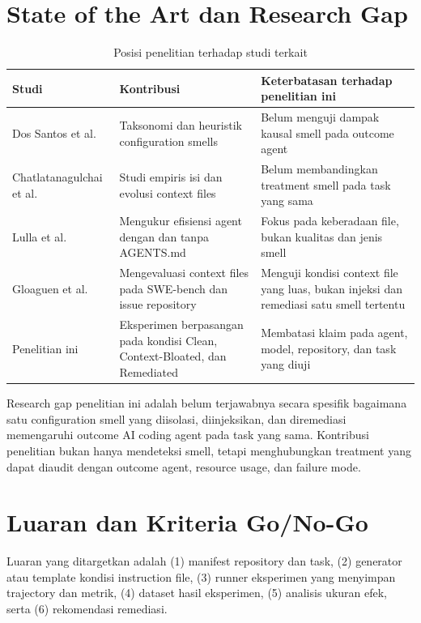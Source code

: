 \section{State of the Art dan Research Gap}

\begin{table}[htbp]
\centering
\small
\caption{Posisi penelitian terhadap studi terkait}
\label{tab:gap}
\begin{tabularx}{\textwidth}{p{3.8cm}YY}
\toprule
\textbf{Studi} & \textbf{Kontribusi} & \textbf{Keterbatasan terhadap penelitian ini} \\
\midrule
Dos Santos et al. \cite{configsmells2026} & Taksonomi dan heuristik configuration smells & Belum menguji dampak kausal smell pada outcome agent \\
Chatlatanagulchai et al. \cite{agentreadmes2025} & Studi empiris isi dan evolusi context files & Belum membandingkan treatment smell pada task yang sama \\
Lulla et al. \cite{lulla2026agents} & Mengukur efisiensi agent dengan dan tanpa AGENTS.md & Fokus pada keberadaan file, bukan kualitas dan jenis smell \\
Gloaguen et al. \cite{gloaguen2026agents} & Mengevaluasi context files pada SWE-bench dan issue repository & Menguji kondisi context file yang luas, bukan injeksi dan remediasi satu smell tertentu \\
Penelitian ini & Eksperimen berpasangan pada kondisi Clean, Context-Bloated, dan Remediated & Membatasi klaim pada agent, model, repository, dan task yang diuji \\
\bottomrule
\end{tabularx}
\end{table}

Research gap penelitian ini adalah belum terjawabnya secara spesifik bagaimana satu configuration smell yang diisolasi, diinjeksikan, dan diremediasi memengaruhi outcome AI coding agent pada task yang sama. Kontribusi penelitian bukan hanya mendeteksi smell, tetapi menghubungkan treatment yang dapat diaudit dengan outcome agent, resource usage, dan failure mode.

\section{Luaran dan Kriteria Go/No-Go}

Luaran yang ditargetkan adalah (1) manifest repository dan task, (2) generator atau template kondisi instruction file, (3) runner eksperimen yang menyimpan trajectory dan metrik, (4) dataset hasil eksperimen, (5) analisis ukuran efek, serta (6) rekomendasi remediasi.

